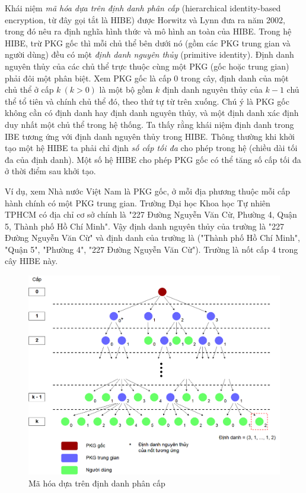 \documentclass[class=report, crop=false]{standalone}
\begin{document}
		Khái niệm \textit{mã hóa dựa trên định danh phân cấp} (hierarchical identity-based encryption, từ đây gọi tắt là HIBE) được Horwitz và Lynn \cite{DBLP:conf/eurocrypt/HorwitzL02} đưa ra năm 2002, trong đó nêu ra định nghĩa hình thức và mô hình an toàn của HIBE. Trong hệ HIBE, trừ PKG gốc thì mỗi chủ thể bên dưới nó (gồm các PKG trung gian và người dùng) đều có một \textit{định danh nguyên thủy} (primitive identity). Định danh nguyên thủy của các chủ thể trực thuộc cùng một PKG (gốc hoặc trung gian) phải đôi một phân biệt. Xem PKG gốc là cấp $0$ trong cây, định danh của một chủ thể ở cấp $k \ (k > 0)$ là một bộ gồm $k$ định danh nguyên thủy của $k - 1$ chủ thể tổ tiên và chính chủ thể đó, theo thứ tự từ trên xuống. Chú ý là PKG gốc không cần có định danh hay định danh nguyên thủy, và một định danh xác định duy nhất một chủ thể trong hệ thống. Ta thấy rằng khái niệm định danh trong IBE tương ứng với định danh nguyên thủy trong HIBE. Thông thường khi khởi tạo một hệ HIBE ta phải chỉ định \textit{số cấp tối đa} cho phép trong hệ (chiều dài tối đa của định danh). Một số hệ HIBE cho phép PKG gốc có thể tăng số cấp tối đa ở thời điểm sau khởi tạo.
		
		Ví dụ, xem Nhà nước Việt Nam là PKG gốc, ở mỗi địa phương thuộc mỗi cấp hành chính có một PKG trung gian. Trường Đại học Khoa học Tự nhiên TPHCM có địa chỉ cơ sở chính là "227 Đường Nguyễn Văn Cừ, Phường 4, Quận 5, Thành phố Hồ Chí Minh". Vậy định danh nguyên thủy của trường là "227 Đường Nguyễn Văn Cừ" và định danh của trường là ("Thành phố Hồ Chí Minh", "Quận 5", "Phường 4", "227 Đường Nguyễn Văn Cừ"). Trường là nốt cấp 4 trong cây HIBE này.
		\begin{figure}[h]
			\captionsetup{font=normalsize}
			\includegraphics[width=\textwidth]{hibe_visualization.png}
			\centering
			\caption{Mã hóa dựa trên định danh phân cấp}
		\end{figure}
\end{document}
